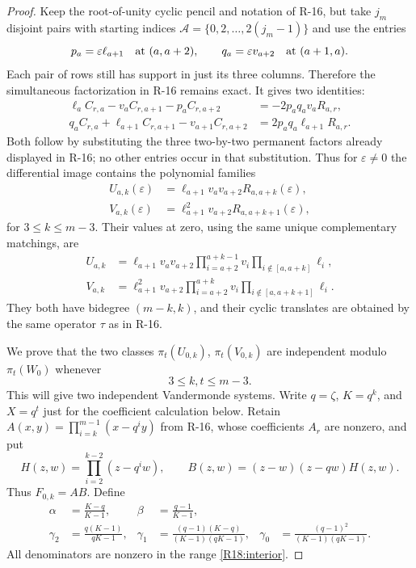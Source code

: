 \documentclass[11pt,a4paper]{article}
\theoremstyle{definition}\newtheorem{definition}{Definition}
\begin{document}
\begin{proof}
Keep the root-of-unity cyclic pencil and notation of R-16,
but take $j_m$ disjoint pairs with starting indices
$\mathcal A=\{0,2,\ldots,2(j_m-1)\}$ and use the entries
\[
 p_a=\varepsilon\ell_{a+1}\quad\hbox{at }(a,a+2),
 \qquad q_a=\varepsilon v_{a+2}\quad\hbox{at }(a+1,a).
\]
Each pair of rows still has support in just its three
columns. Therefore the simultaneous factorization in
R-16 remains exact. It gives two identities:
\begin{align*}
 \ell_a C_{r,a}-v_a C_{r,a+1}-p_a C_{r,a+2}
    &=-2p_aq_a v_a R_{a,r},\\
 q_a C_{r,a}+\ell_{a+1} C_{r,a+1}-v_{a+1} C_{r,a+2}
    &= 2p_aq_a\ell_{a+1}R_{a,r}.
\end{align*}
Both follow by substituting the three two-by-two permanent
factors already displayed in R-16; no other entries occur
in that substitution. Thus for $\varepsilon\ne0$ the
differential image contains the polynomial families
\[
 \begin{aligned}
 U_{a,k}(\varepsilon)
    &=\ell_{a+1}v_a v_{a+2}R_{a,a+k}(\varepsilon),\\
 V_{a,k}(\varepsilon)
    &=\ell_{a+1}^2v_{a+2}R_{a,a+k+1}(\varepsilon),
 \end{aligned}
\]
for $3\leq k\leq m-3$. Their values at zero, using the
same unique complementary matchings, are
\[
 \begin{aligned}
 U_{a,k}&=\ell_{a+1}v_a v_{a+2}
          \prod_{i=a+2}^{a+k-1}v_i
          \prod_{i\notin[a,a+k]}\ell_i,\\
 V_{a,k}&=\ell_{a+1}^2v_{a+2}
          \prod_{i=a+2}^{a+k}v_i
          \prod_{i\notin[a,a+k+1]}\ell_i.
 \end{aligned}
\]
They both have bidegree $(m-k,k)$, and their cyclic
translates are obtained by the same operator $\tau$ as
in R-16.

We prove that the two classes
$\pi_t(U_{0,k})$, $\pi_t(V_{0,k})$ are independent
modulo $\pi_t(W_0)$ whenever
\begin{equation}\label{R18:interior}
 3\leq k,t\leq m-3.
\end{equation}
This will give two independent Vandermonde systems.
Write $q=\zeta$, $K=q^k$, and $X=q^t$ just for the
coefficient calculation below. Retain
$A(x,y)=\prod_{i=k}^{m-1}(x-q^iy)$ from R-16, whose
coefficients $A_r$ are nonzero, and put
\[
 H(z,w)=\prod_{i=2}^{k-2}(z-q^iw),\qquad
 B(z,w)=(z-w)(z-qw)H(z,w).
\]
Thus $F_{0,k}=AB$. Define
\[
 \begin{aligned}
 \alpha&=\frac{K-q}{K-1},&
 \beta&=\frac{q-1}{K-1},\\
 \gamma_2&=\frac{q(K-1)}{qK-1},&
 \gamma_1&=\frac{(q-1)(K-q)}{(K-1)(qK-1)},&
 \gamma_0&=\frac{(q-1)^2}{(K-1)(qK-1)}.
 \end{aligned}
\]
All denominators are nonzero in the range
\eqref{R18:interior}.


\end{proof}
\end{document}
